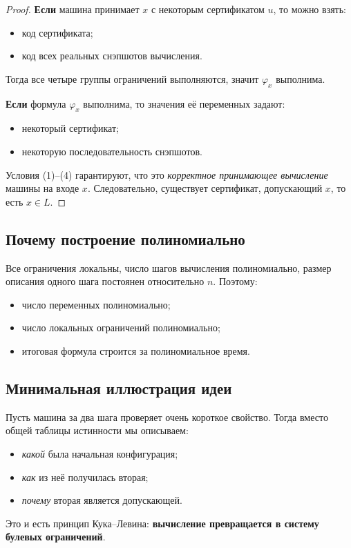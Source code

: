 \documentclass[12pt,a4paper]{article}
\theoremstyle{definition}
\theoremstyle{plain}
\begin{document}
\begin{proof}
\textbf{Если} машина принимает $x$ с некоторым сертификатом $u$, то можно взять:
\begin{itemize}
\item код сертификата;
\item код всех реальных снэпшотов вычисления.
\end{itemize}
Тогда все четыре группы ограничений выполняются, значит $\varphi_x$ выполнима.

\medskip
\noindent
\textbf{Если} формула $\varphi_x$ выполнима, то значения её переменных задают:
\begin{itemize}
\item некоторый сертификат;
\item некоторую последовательность снэпшотов.
\end{itemize}
Условия (1)--(4) гарантируют, что это \emph{корректное принимающее вычисление} машины на входе $x$. Следовательно, существует сертификат, допускающий $x$, то есть $x\in L$.
\end{proof}

\subsection{Почему построение полиномиально}
Все ограничения локальны, число шагов вычисления полиномиально, размер описания одного шага постоянен относительно $n$. Поэтому:
\begin{itemize}
\item число переменных полиномиально;
\item число локальных ограничений полиномиально;
\item итоговая формула строится за полиномиальное время.
\end{itemize}

\subsection{Минимальная иллюстрация идеи}
Пусть машина за два шага проверяет очень короткое свойство. Тогда вместо общей таблицы истинности мы описываем:
\begin{itemize}
\item \emph{какой} была начальная конфигурация;
\item \emph{как} из неё получилась вторая;
\item \emph{почему} вторая является допускающей.
\end{itemize}
Это и есть принцип Кука--Левина: \textbf{вычисление превращается в систему булевых ограничений}.
\end{document}
